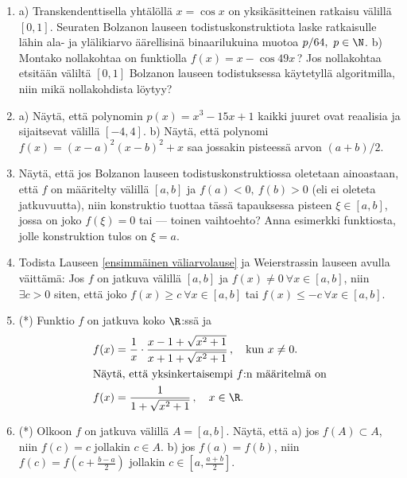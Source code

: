 \begin{enumerate}
\item
a) Transkendenttisella yhtälöllä $x=\cos x$ on yksikäsitteinen ratkaisu välillä $[0,1]$.
Seuraten Bolzanon lauseen todistuskonstruktiota laske ratkaisulle lähin ala- ja ylälikiarvo 
äärellisinä binaarilukuina muotoa $p/64,\ p\in\N$. \vspace{1mm}\newline
b) Montako nollakohtaa on funktiolla $f(x)=x-\cos 49x$\,? Jos nollakohtaa etsitään väliltä
$[0,1]$ Bolzanon lauseen todistuksessa käytetyllä algoritmilla, niin mikä nollakohdista
löytyy?

\pagebreak

\item
a) Näytä, että polynomin $p(x)=x^3-15x+1$ kaikki juuret ovat reaalisia ja sijaitsevat
välillä $[-4,4]$. \vspace{1mm}\newline
b) Näytä, että polynomi $f(x)=(x-a)^2(x-b)^2+x$ saa jossakin pisteessä arvon $(a+b)/2$.

\item
Näytä, että jos Bolzanon lauseen todistuskonstruktiossa oletetaan ainoastaan, että $f$ on
määritelty välillä $[a,b]$ ja $f(a)<0,\ f(b)>0$ (eli ei oleteta jatkuvuutta), niin
konstruktio tuottaa tässä tapauksessa pisteen $\xi\in[a,b]$, jossa on joko $f(\xi)=0$ tai
--- toinen vaihtoehto? Anna esimerkki funktiosta, jolle konstruktion tulos on $\xi=a$.

\item \label{H-V-1: Weierstrassin seuraus}
Todista Lauseen \ref{ensimmäinen väliarvolause} ja Weierstrassin lauseen avulla väittämä:
Jos $f$ on jatkuva välillä $[a,b]$ ja $f(x) \neq 0\ \forall x\in[a,b]$, niin $\exists c>0$
siten, että joko $f(x) \ge c\ \forall x\in[a,b]$ tai $f(x) \le -c\ \forall x\in[a,b]$.

\item (*) \label{H-V-1: pelkistyvä funktio}
Funktio $f$ on jatkuva koko $\R$:ssä ja
\begin{align*}
&f(x) = \frac{1}{x}\cdot\frac{x-1+\sqrt{x^2+1}}{x+1+\sqrt{x^2+1}}\,, \quad 
                                                    \text{kun}\ x \neq 0. \\
\intertext{Näytä, että yksinkertaisempi $f$:n määritelmä on}
&f(x) = \frac{1}{1+\sqrt{x^2+1}}\,, \quad x\in\R.
\end{align*}

\item (*) \label{H-V-1: kiintopisteongelmia}
Olkoon $f$ on jatkuva välillä $A=[a,b]$. Näytä, että \newline
a) jos $f(A) \subset A$, niin $f(c)=c$ jollakin $c \in A$. \newline
b) jos $f(a)=f(b)$, niin $f(c)=f(c+\tfrac{b-a}{2})$ jollakin $c\in[a,\tfrac{a+b}{2}]$.


\end{enumerate}
